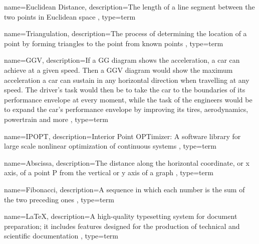 {
    name=Euclidean Distance,
    description={The length of a line segment between the two points in Euclidean space \cite{precalculus_a_problems_oriented_approach}},
    type=term
}

{
    name=Triangulation,
    description={The process of determining the location of a point by forming triangles to the point from known points \cite{multiple_view_geometry_in_computer_vision}},
    type=term
}

{
    name=GGV,
    description={If a GG diagram shows the acceleration, a car can achieve at a given speed. Then a GGV diagram would show the maximum acceleration a car can sustain in any horizontal direction when travelling at any speed. The driver's task would then be to take the car to the boundaries of its performance envelope at every moment, while the task of the engineers would be to expand the car's performance envelope by improving its tires, aerodynamics, powertrain and more \cite{the_performance_envelope_or_ggv_diagram}},
    type=term
}

{
    name=IPOPT,
    description={Interior Point OPTimizer: A software library for large scale nonlinear optimization of continuous systems \cite{ipopt}},
    type=term
}

{
    name=Abscissa,
    description={The distance along the horizontal coordinate, or x axis, of a point P from the vertical or y axis of a graph \cite{a_dictionary_of_epidemology}},
    type=term
}

{
    name=Fibonacci,
    description={A sequence in which each number is the sum of the two preceding ones \cite{fibonacci}},
    type=term
}

{
    name=LaTeX,
    description={A high-quality typesetting system for document preparation; it includes features designed for the production of technical and scientific documentation \cite{latex}},
    type=term
}

